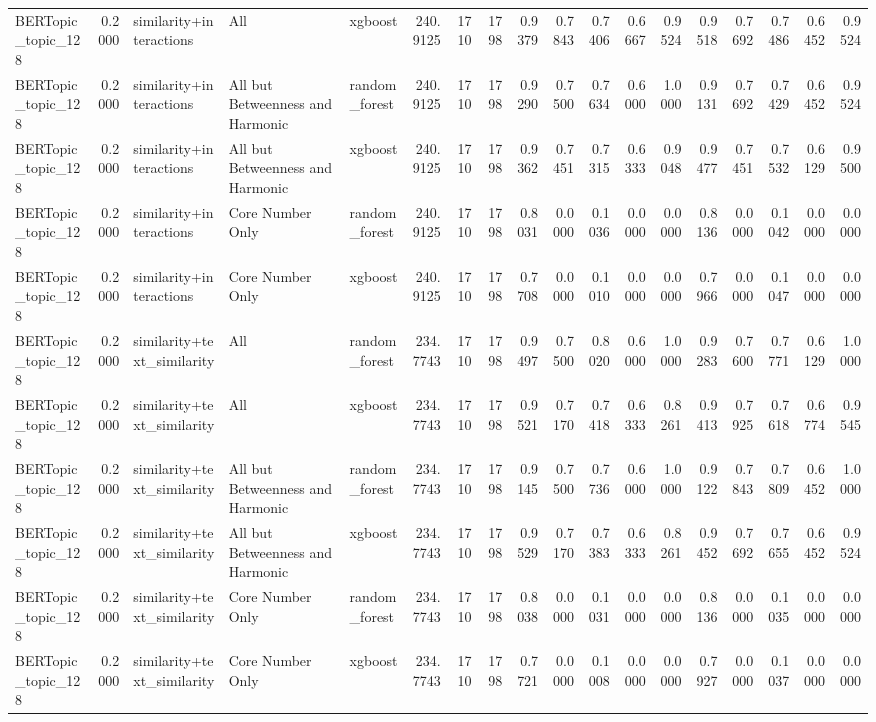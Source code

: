 \begin{tabular}{lrlllrrrrrrrrrrrrr}
BERTopic_topic_128 & 0.2000 & similarity+interactions & All & xgboost & 240.9125 & 1710 & 1798 & 0.9379 & 0.7843 & 0.7406 & 0.6667 & 0.9524 & 0.9518 & 0.7692 & 0.7486 & 0.6452 & 0.9524 \\
BERTopic_topic_128 & 0.2000 & similarity+interactions & All but Betweenness and Harmonic & random_forest & 240.9125 & 1710 & 1798 & 0.9290 & 0.7500 & 0.7634 & 0.6000 & 1.0000 & 0.9131 & 0.7692 & 0.7429 & 0.6452 & 0.9524 \\
BERTopic_topic_128 & 0.2000 & similarity+interactions & All but Betweenness and Harmonic & xgboost & 240.9125 & 1710 & 1798 & 0.9362 & 0.7451 & 0.7315 & 0.6333 & 0.9048 & 0.9477 & 0.7451 & 0.7532 & 0.6129 & 0.9500 \\
BERTopic_topic_128 & 0.2000 & similarity+interactions & Core Number Only & random_forest & 240.9125 & 1710 & 1798 & 0.8031 & 0.0000 & 0.1036 & 0.0000 & 0.0000 & 0.8136 & 0.0000 & 0.1042 & 0.0000 & 0.0000 \\
BERTopic_topic_128 & 0.2000 & similarity+interactions & Core Number Only & xgboost & 240.9125 & 1710 & 1798 & 0.7708 & 0.0000 & 0.1010 & 0.0000 & 0.0000 & 0.7966 & 0.0000 & 0.1047 & 0.0000 & 0.0000 \\
BERTopic_topic_128 & 0.2000 & similarity+text_similarity & All & random_forest & 234.7743 & 1710 & 1798 & 0.9497 & 0.7500 & 0.8020 & 0.6000 & 1.0000 & 0.9283 & 0.7600 & 0.7771 & 0.6129 & 1.0000 \\
BERTopic_topic_128 & 0.2000 & similarity+text_similarity & All & xgboost & 234.7743 & 1710 & 1798 & 0.9521 & 0.7170 & 0.7418 & 0.6333 & 0.8261 & 0.9413 & 0.7925 & 0.7618 & 0.6774 & 0.9545 \\
BERTopic_topic_128 & 0.2000 & similarity+text_similarity & All but Betweenness and Harmonic & random_forest & 234.7743 & 1710 & 1798 & 0.9145 & 0.7500 & 0.7736 & 0.6000 & 1.0000 & 0.9122 & 0.7843 & 0.7809 & 0.6452 & 1.0000 \\
BERTopic_topic_128 & 0.2000 & similarity+text_similarity & All but Betweenness and Harmonic & xgboost & 234.7743 & 1710 & 1798 & 0.9529 & 0.7170 & 0.7383 & 0.6333 & 0.8261 & 0.9452 & 0.7692 & 0.7655 & 0.6452 & 0.9524 \\
BERTopic_topic_128 & 0.2000 & similarity+text_similarity & Core Number Only & random_forest & 234.7743 & 1710 & 1798 & 0.8038 & 0.0000 & 0.1031 & 0.0000 & 0.0000 & 0.8136 & 0.0000 & 0.1035 & 0.0000 & 0.0000 \\
BERTopic_topic_128 & 0.2000 & similarity+text_similarity & Core Number Only & xgboost & 234.7743 & 1710 & 1798 & 0.7721 & 0.0000 & 0.1008 & 0.0000 & 0.0000 & 0.7927 & 0.0000 & 0.1037 & 0.0000 & 0.0000 \\

\end{tabular}

